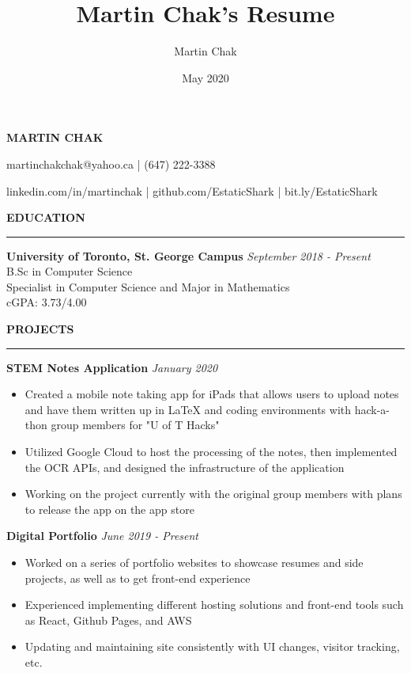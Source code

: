 \documentclass[12pt,letterpaper]{article}
\title{Martin Chak's Resume}
\author{Martin Chak}
\date{May 2020}
\begin{document}
    \centerline{\MakeUppercase{\fontsize{20pt}{5pt}\bf Martin Chak}}
    \begingroup
        \centerline{martinchakchak@yahoo.ca | (647) 222-3388}
        \centerline{linkedin.com/in/martinchak | github.com/EstaticShark | bit.ly/EstaticShark}
    \endgroup
    
    \begingroup
        \MakeUppercase{\bf Education} \vspace{0.1cm}
        \hrule
        
        {\bf University of Toronto, St. George Campus} \hfill {\em September 2018 - Present}\\
        {B.Sc in Computer Science}\\
        {Specialist in Computer Science and Major in Mathematics}\\
        {cGPA: 3.73/4.00}\\
    \endgroup
    
    \begingroup
        \MakeUppercase{\bf Projects} \vspace{0.1cm}
        \hrule
        
        {\bf STEM Notes Application} \hfill {\em January 2020}\\
        \begin{itemize}\vspace{-1.8em}
            \item {Created a mobile note taking app for iPads that allows users to upload notes and have them written up in LaTeX and coding environments with hack-a-thon group members for "U of T Hacks"}
            \item {Utilized Google Cloud to host the processing of the notes, then implemented the OCR APIs, and designed the infrastructure of the application}
            \item {Working on the project currently with the original group members with plans to release the app on the app store}
        \end{itemize}
        
        {\bf Digital Portfolio} \hfill {\em June 2019 - Present}\\
        \begin{itemize}\vspace{-1.8em}
            \item {Worked on a series of portfolio websites to showcase resumes and side projects, as well as to get front-end experience}
            \item {Experienced implementing different hosting solutions and front-end tools such as React, Github Pages, and AWS}
            \item {Updating and maintaining site consistently with UI changes, visitor tracking, etc.}
        \end{itemize}
        
\end{document}
